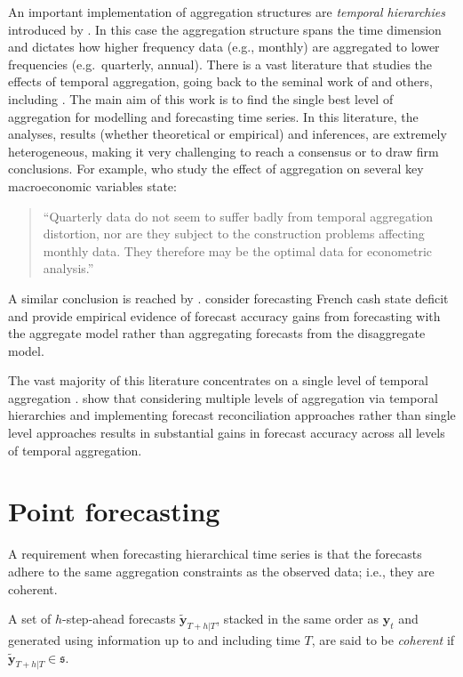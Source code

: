 \documentclass[graybox]{svmult}
\begin{document}
An important implementation of aggregation structures are \textit{temporal hierarchies} introduced by \citet{AthEtAl2017}. In this case the aggregation structure spans the time dimension and dictates how higher frequency data (e.g., monthly) are aggregated to lower frequencies (e.g.\ quarterly, annual). There is a vast literature that studies the effects of temporal aggregation, going back to the seminal work of \citet{ZelMon1971, AmeWu1972, Tia1972, Bre1973} and others, including \citet{Hot1993, HotCar1993, Mar1999, SilEtAl2008}. The main aim of this work is to find the single best level of aggregation for modelling and forecasting time series. In this literature, the analyses, results (whether theoretical or empirical) and inferences, are extremely heterogeneous, making it very challenging to reach a consensus or to draw firm conclusions. For example, \citet{RosSea1995} who study the effect of aggregation on several key macroeconomic variables state:
\begin{quote}
``Quarterly data do not seem to suffer badly from temporal aggregation distortion, nor are they subject to the construction problems affecting monthly data. They therefore may be the optimal data for econometric analysis.''
\end{quote}
A similar conclusion is reached by \citet{NijPal1990}. \citet{SilEtAl2008} consider forecasting French cash state deficit and provide empirical evidence of forecast accuracy gains from forecasting with the aggregate model rather than aggregating forecasts from the disaggregate model.

The vast majority of this literature concentrates on a single level of temporal aggregation \citep[although there are some notable exceptions such as][]{AndEtAl2011,KouEtAl2014}. \citet{AthEtAl2017} show that considering multiple levels of aggregation via temporal hierarchies and implementing forecast reconciliation approaches rather than single level approaches results in substantial gains in forecast accuracy across all levels of temporal aggregation.

\section{Point forecasting}\label{sec:point forecasting}

A requirement when forecasting hierarchical time series is that the forecasts adhere to the same aggregation constraints as the observed data; i.e., they are coherent.

\begin{definition}\label{def:coherence}
	A set of $h$-step-ahead forecasts $\tilde{\bm{y}}_{T+h|T}$, stacked in the same order as $\bm{y}_{t}$ and generated using information up to and including time $T$, are said to be \textit{coherent} if $\tilde{\bm{y}}_{T+h|T} \in \mathfrak{s}$.
\end{definition}
\end{document}

